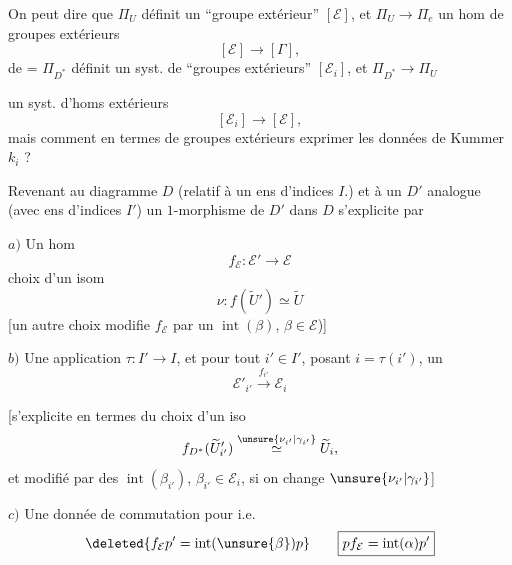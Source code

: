 On peut dire que $\Pi_U$ définit un ``groupe extérieur'' $[\mathcal E]$, et $\Pi_U\longrightarrow\Pi_e$ un hom de groupes extérieurs
\[
[\mathcal E]\longrightarrow[\Gamma],
\]
de = $\Pi_{D^*}$ définit un syst. de ``groupes extérieurs'' $[\mathcal E_i]$, et  $\Pi_{D^*}\longrightarrow\Pi_U$

un syst. d'homs extérieurs
\[
[\mathcal E_i]\longrightarrow[\mathcal E],
\]
 mais comment en termes de groupes extérieurs exprimer les données de Kummer $k_i$ ?

Revenant au  diagramme $D$ (relatif à un ens d'indices $I$.) et à un $D'$ analogue (avec ens d'indices $I'$)
un $1$-morphisme  de $D'$ dans $D$ s'explicite par

$a)$ Un hom
\[
\boxed{\boxed{f_{\mathcal E}:\mathcal E'\longrightarrow\mathcal E}}
\]
 choix d'un isom
\[
\nu:f(\widetilde U')\simeq\widetilde U
\]
[un autre choix modifie $f_{\mathcal E}$ par un $\operatorname{int}(\beta)$, $\beta\in\mathcal E$)]

$b)$ Une  application $\tau:I'\longrightarrow I$, et pour tout $i'\in I'$, posant $i=\tau(i')$, un 
\[
\boxed{\mathcal E'_{i'}\xrightarrow{f_{i'}}\mathcal E_i}
\]

[s'explicite en termes du choix d'un iso
\[
f_{D^*}(\widetilde U'_{i'})\overset{\unsure{\nu_{i'}|\gamma_{i'}}}{\simeq}\widetilde U_i,
\]
et modifié par des $\operatorname{int}(\beta_{i'})$, $\beta_{i'}\in\mathcal E_i$, si on change $\unsure{\nu_{i'}|\gamma_{i'}}$]

$c)$ Une donnée de commutation pour
i.e.
\[
\deleted{f_{\mathcal E}p'=\operatorname{int}(\unsure{\beta})p}
\qquad\boxed{pf_{\mathcal E}=\operatorname{int}(\alpha)p'}
\]

